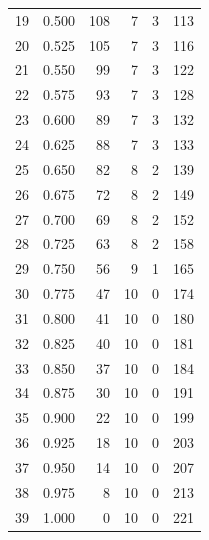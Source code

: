 \documentclass[a4paper,twoside,12pt]{book}
\begin{document}
\begin{appendices}
\begin{table}
\begin{tabular}{lrrrrr}
		19 &  0.500 &       108 &         7 &               3 &             113 \\
		20 &  0.525 &       105 &         7 &               3 &             116 \\
		21 &  0.550 &        99 &         7 &               3 &             122 \\
		22 &  0.575 &        93 &         7 &               3 &             128 \\
		23 &  0.600 &        89 &         7 &               3 &             132 \\
		24 &  0.625 &        88 &         7 &               3 &             133 \\
		25 &  0.650 &        82 &         8 &               2 &             139 \\
		26 &  0.675 &        72 &         8 &               2 &             149 \\
		27 &  0.700 &        69 &         8 &               2 &             152 \\
		28 &  0.725 &        63 &         8 &               2 &             158 \\
		29 &  0.750 &        56 &         9 &               1 &             165 \\
		30 &  0.775 &        47 &        10 &               0 &             174 \\
		31 &  0.800 &        41 &        10 &               0 &             180 \\
		32 &  0.825 &        40 &        10 &               0 &             181 \\
		33 &  0.850 &        37 &        10 &               0 &             184 \\
		34 &  0.875 &        30 &        10 &               0 &             191 \\
		35 &  0.900 &        22 &        10 &               0 &             199 \\
		36 &  0.925 &        18 &        10 &               0 &             203 \\
		37 &  0.950 &        14 &        10 &               0 &             207 \\
		38 &  0.975 &         8 &        10 &               0 &             213 \\
		39 &  1.000 &         0 &        10 &               0 &             221 \\
		\bottomrule
	\end{tabular}		
\end{table} 


\end{appendices}
\end{document}
